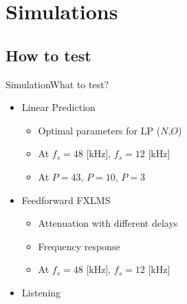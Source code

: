 


\section{Simulations}
\subsection{How to test}

\begin{frame}{Simulation}{What to test?}	
\begin{itemize}
	\item Linear Prediction
	\begin{itemize}
		\item Optimal parameters for LP ($N$,$O$)
		\item At  $f_s = 48$ [kHz],  $f_s = 12$ [kHz]
		\item At $P=43$, $P=10$, $P=3$ 
	\end{itemize}
	\item Feedforward FXLMS	
	\begin{itemize}
		\item Attenuation with different delays
		\item Frequency response
		\item At  $f_s = 48$ [kHz],  $f_s = 12$ [kHz] 
	\end{itemize}
	\item Listening
\end{itemize}
\end{frame}

